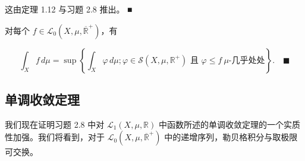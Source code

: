 \begin{remark}
\begin{items}
\begin{subitems}
\end{subitems}

\begin{subitems}
\item

这由定理 1.12 与习题 2.8 推出。 \nobreak\hspace{0.35em}■

\end{subitems}

\item

对每个 $ f \in \mathcal{L}_0(X,\mu,\overline{\mathbb{R}}^+) $，有

\[
\int_X f\,d\mu = \sup \left\{ \int_X \varphi\,d\mu ; \varphi \in \mathcal{S}(X,\mu,\mathbb{R}^+) \text{ 且 } \varphi \le f \ \mu\text{-几乎处处} \right\} .\quad\blacksquare
\]
\end{items}

\end{remark}

\subsection*{单调收敛定理}

我们现在证明习题 2.8 中对 $ \mathcal{L}_1(X,\mu,\mathbb{R}) $ 中函数所述的单调收敛定理的一个实质性加强。我们将看到，对于 $ \mathcal{L}_0(X,\mu,\overline{\mathbb{R}}^+) $ 中的递增序列，勒贝格积分与取极限可交换。

